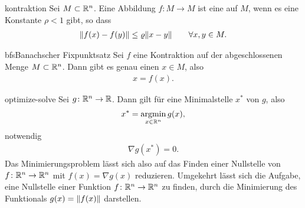 \begin{Definition}{kontraktion}
  Sei $M\subset\mathbb R^n$. Eine Abbildung $f\colon M\to M$ ist eine  auf $M$, wenn es eine Konstante $\rho < 1$ gibt, so dass
  \begin{gather}
    \lVert f(x) - f(y)\rVert \le \varrho \lVert x-y\rVert \qquad\forall x,y\in M.
  \end{gather}
\end{Definition}

\begin{Satz*}{bfs}{Banachscher Fixpunktsatz}
  Sei $f$ eine Kontraktion auf der abgeschlossenen Menge $M\subset\mathbb R^n$. Dann gibt es genau einen  $x\in M$, also
  \begin{gather}
    x = f(x).
  \end{gather}
\end{Satz*}

\begin{Satz}{optimize-solve}
  Sei $g\colon \mathbb R^n\to \mathbb R$. Dann gilt für eine Minimalstelle $x^*$ von $g$,
  also
  \begin{gather}
    x^* = \operatorname*{argmin}_{x\in\mathbb R^n} g(x),
  \end{gather}
  notwendig
  \begin{gather}
    \nabla g(x^*) = 0.
  \end{gather}
  Das Minimierungsproblem lässt sich also auf das Finden einer
  Nullstelle von $f\colon \mathbb R^n\to \mathbb R^n$ mit $f(x) = \nabla g(x)$
  reduzieren. Umgekehrt lässt sich die Aufgabe, eine Nullstelle einer
  Funktion $f\colon \mathbb R^n \to \mathbb R^n$ zu finden, durch die Minimierung
  des Funktionals $g(x) = \lVert f(x)\rVert$ darstellen.
\end{Satz}


